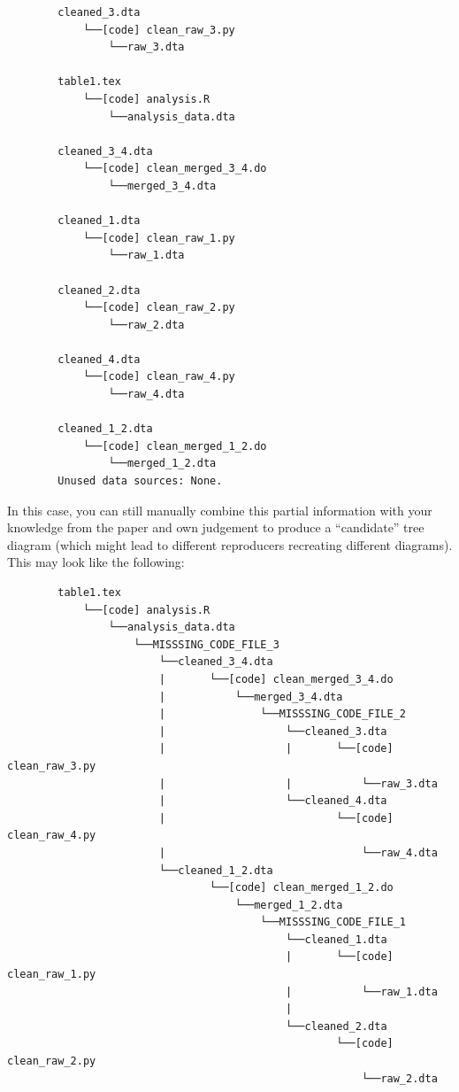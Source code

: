 \documentclass[
]{book}
\begin{document}
\begin{verbatim}
        cleaned_3.dta
            └──[code] clean_raw_3.py
                └──raw_3.dta

        table1.tex
            └──[code] analysis.R
                └──analysis_data.dta

        cleaned_3_4.dta
            └──[code] clean_merged_3_4.do
                └──merged_3_4.dta

        cleaned_1.dta
            └──[code] clean_raw_1.py
                └──raw_1.dta

        cleaned_2.dta
            └──[code] clean_raw_2.py
                └──raw_2.dta

        cleaned_4.dta
            └──[code] clean_raw_4.py
                └──raw_4.dta

        cleaned_1_2.dta
            └──[code] clean_merged_1_2.do
                └──merged_1_2.dta
        Unused data sources: None.
\end{verbatim}

In this case, you can still manually combine this partial information with your knowledge from the paper and own judgement to produce a ``candidate'' tree diagram (which might lead to different reproducers recreating different diagrams). This may look like the following:

\begin{verbatim}
        table1.tex
            └──[code] analysis.R
                └──analysis_data.dta
                    └──MISSSING_CODE_FILE_3
                        └──cleaned_3_4.dta
                        |       └──[code] clean_merged_3_4.do
                        |           └──merged_3_4.dta
                        |               └──MISSSING_CODE_FILE_2
                        |                   └──cleaned_3.dta
                        |                   |       └──[code] clean_raw_3.py
                        |                   |           └──raw_3.dta    
                        |                   └──cleaned_4.dta
                        |                           └──[code] clean_raw_4.py
                        |                               └──raw_4.dta
                        └──cleaned_1_2.dta
                                └──[code] clean_merged_1_2.do
                                    └──merged_1_2.dta
                                        └──MISSSING_CODE_FILE_1
                                            └──cleaned_1.dta
                                            |       └──[code] clean_raw_1.py
                                            |           └──raw_1.dta
                                            |   
                                            └──cleaned_2.dta
                                                    └──[code] clean_raw_2.py
                                                        └──raw_2.dta
\end{verbatim}
\end{document}
